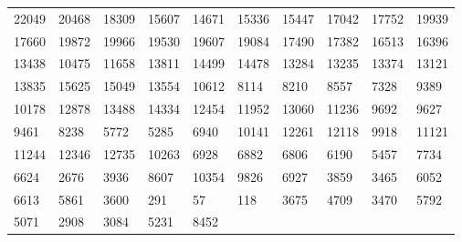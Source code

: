 \documentclass[reqno, 11pt]{amsart}
\theoremstyle{remark}
\begin{document}
\begin{longtable}{llllllllll}
22049 & 20468 & 18309 & 15607 & 14671 & 15336 & 15447 & 17042 & 17752 & 19939 \\
17660 & 19872 & 19966 & 19530 & 19607 & 19084 & 17490 & 17382 & 16513 & 16396 \\
13438 & 10475 & 11658 & 13811 & 14499 & 14478 & 13284 & 13235 & 13374 & 13121 \\
13835 & 15625 & 15049 & 13554 & 10612 & 8114 & 8210 & 8557 & 7328 & 9389 \\
10178 & 12878 & 13488 & 14334 & 12454 & 11952 & 13060 & 11236 & 9692 & 9627 \\
9461 & 8238 & 5772 & 5285 & 6940 & 10141 & 12261 & 12118 & 9918 & 11121 \\
11244 & 12346 & 12735 & 10263 & 6928 & 6882 & 6806 & 6190 & 5457 & 7734 \\
6624 & 2676 & 3936 & 8607 & 10354 & 9826 & 6927 & 3859 & 3465 & 6052 \\
6613 & 5861 & 3600 & 291 & 57 & 118 & 3675 & 4709 & 3470 & 5792 \\
5071 & 2908 & 3084 & 5231 & 8452 & \text{} & \text{} & \text{} & \text{} & \text{} \\
\end{longtable}



\end{document}
